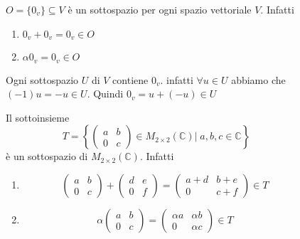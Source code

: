 \documentclass[a4paper]{article}
\theoremstyle{break}
\theoremstyle{break}
\theoremstyle{break}
\theoremstyle{break}
\begin{document}
  \begin{figure}[H]
    \begin{example}
      \( O = \{0_v\} \subseteq V \) è un sottospazio per ogni spazio vettoriale \( V \).
      Infatti 
      \begin{enumerate}
        \item \( 0_v + 0_v = 0_v \in O \) 
        \item \( \alpha 0_v = 0_v \in O \) 
      \end{enumerate}
      Ogni sottospazio \( U \) di \( V \) contiene \( 0_v \). infatti \( \forall u \in U \)
      abbiamo che \( (-1)u = -u \in U \). Quindi \( 0_v = u + (-u) \in U \) 
    \end{example}
  \end{figure}
  \begin{figure}[H]
    \begin{example}
      Il sottoinsieme 
      \[
        T = \left\{ \begin{pmatrix} a & b\\
            0 & c
        \end{pmatrix} \in M_{2 \times 2}(\mathbb{C}) \Big | \;
        a,b,c \in \mathbb{C} \right\}
      \] 
      è un sottospazio di \( M_{2 \times 2}(\mathbb{C}) \). Infatti
      \begin{enumerate}
        \item \[
        \begin{pmatrix} 
          a & b\\
          0 & c
        \end{pmatrix} 
        +
        \begin{pmatrix} 
          d & e\\
          0 & f
        \end{pmatrix} 
        =
        \begin{pmatrix} 
          a+d & b+e\\
          0 & c+f
        \end{pmatrix} \in T
        \] 
        \item
          \[
          \alpha \begin{pmatrix} 
            a & b\\
            0 & c
          \end{pmatrix}
          =
          \begin{pmatrix} 
            \alpha a & \alpha b\\
            0 & \alpha c
          \end{pmatrix} \in T
          \] 
      \end{enumerate}
    \end{example}
  \end{figure}
\end{document}
